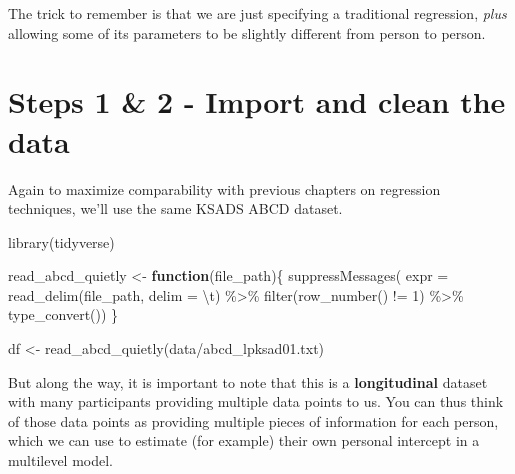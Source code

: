\documentclass[
]{book}
\newenvironment{Shaded}{\begin{snugshade}}{\end{snugshade}}
\newcommand{\AttributeTok}[1]{\textcolor[rgb]{0.77,0.63,0.00}{#1}}
\newcommand{\ControlFlowTok}[1]{\textcolor[rgb]{0.13,0.29,0.53}{\textbf{#1}}}
\newcommand{\DecValTok}[1]{\textcolor[rgb]{0.00,0.00,0.81}{#1}}
\newcommand{\FunctionTok}[1]{\textcolor[rgb]{0.00,0.00,0.00}{#1}}
\newcommand{\NormalTok}[1]{#1}
\newcommand{\OtherTok}[1]{\textcolor[rgb]{0.56,0.35,0.01}{#1}}
\newcommand{\SpecialCharTok}[1]{\textcolor[rgb]{0.00,0.00,0.00}{#1}}
\newcommand{\StringTok}[1]{\textcolor[rgb]{0.31,0.60,0.02}{#1}}
\begin{document}
The trick to remember is that we are just specifying a traditional regression, \emph{plus} allowing some of its parameters to be slightly different from person to person.

\hypertarget{steps-1-2---import-and-clean-the-data}{%
\section{Steps 1 \& 2 - Import and clean the data}\label{steps-1-2---import-and-clean-the-data}}

Again to maximize comparability with previous chapters on regression techniques, we'll use the same KSADS ABCD dataset.

\begin{Shaded}
\begin{Highlighting}[]
\FunctionTok{library}\NormalTok{(tidyverse)}

\NormalTok{read\_abcd\_quietly }\OtherTok{\textless{}{-}} \ControlFlowTok{function}\NormalTok{(file\_path)\{}
  \FunctionTok{suppressMessages}\NormalTok{(}
    \AttributeTok{expr =} \FunctionTok{read\_delim}\NormalTok{(file\_path, }\AttributeTok{delim =} \StringTok{\textquotesingle{}}\SpecialCharTok{\textbackslash{}t}\StringTok{\textquotesingle{}}\NormalTok{) }\SpecialCharTok{\%\textgreater{}\%} 
      \FunctionTok{filter}\NormalTok{(}\FunctionTok{row\_number}\NormalTok{() }\SpecialCharTok{!=} \DecValTok{1}\NormalTok{) }\SpecialCharTok{\%\textgreater{}\%} 
      \FunctionTok{type\_convert}\NormalTok{())}
\NormalTok{\}}

\NormalTok{df }\OtherTok{\textless{}{-}} \FunctionTok{read\_abcd\_quietly}\NormalTok{(}\StringTok{\textquotesingle{}data/abcd\_lpksad01.txt\textquotesingle{}}\NormalTok{)}
\end{Highlighting}
\end{Shaded}

But along the way, it is important to note that this is a \textbf{longitudinal} dataset with many participants providing multiple data points to us. You can thus think of those data points as providing multiple pieces of information for each person, which we can use to estimate (for example) their own personal intercept in a multilevel model.
\end{document}
